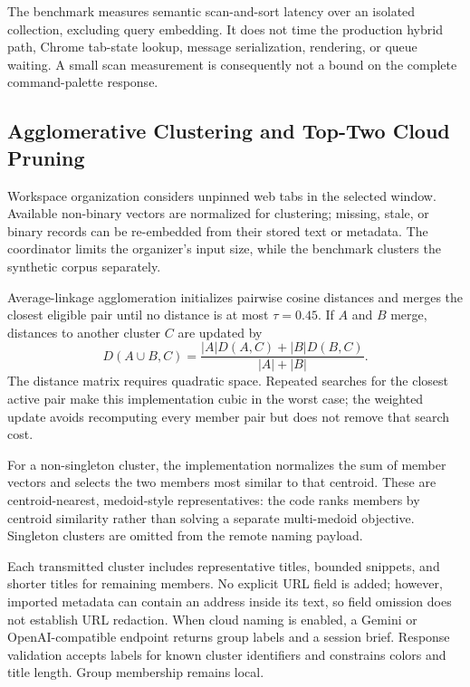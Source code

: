 \documentclass[conference]{IEEEtran}
\newcommand{\mThreshold}{0.45}
\begin{document}
The benchmark measures semantic scan-and-sort latency over an isolated
collection, excluding query embedding. It does not time the production hybrid
path, Chrome tab-state lookup, message serialization, rendering, or queue
waiting. A small scan measurement is consequently not a bound on the complete
command-palette response.

\subsection{Agglomerative Clustering and Top-Two Cloud Pruning}
Workspace organization considers unpinned web tabs in the selected window.
Available non-binary vectors are normalized for clustering; missing, stale,
or binary records can be re-embedded from their stored text or metadata.
The coordinator limits the organizer's input size, while the benchmark
clusters the synthetic corpus separately.

Average-linkage agglomeration initializes pairwise cosine distances and
merges the closest eligible pair until no distance is at most
$\tau=\mThreshold$. If $A$ and $B$ merge, distances to another cluster $C$
are updated by
\begin{equation}
 D(A\cup B,C)=
 \frac{|A|D(A,C)+|B|D(B,C)}{|A|+|B|}.
 \label{eq:linkage}
\end{equation}
The distance matrix requires quadratic space. Repeated searches for the
closest active pair make this implementation cubic in the worst case; the
weighted update avoids recomputing every member pair but does not remove that
search cost.

For a non-singleton cluster, the implementation normalizes the sum of member
vectors and selects the two members most similar to that centroid. These are
centroid-nearest, medoid-style representatives: the code ranks members by
centroid similarity rather than solving a separate multi-medoid objective.
Singleton clusters are omitted from the remote naming payload.

Each transmitted cluster includes representative titles, bounded snippets,
and shorter titles for remaining members. No explicit URL field is added;
however, imported metadata can contain an address inside its text, so field
omission does not establish URL redaction. When cloud naming is enabled, a
Gemini or OpenAI-compatible endpoint returns group labels and a session brief.
Response validation accepts labels for known cluster identifiers and
constrains colors and title length. Group membership remains local.
\end{document}
